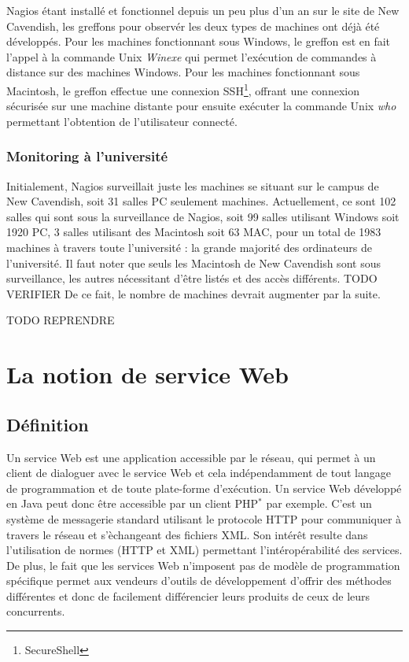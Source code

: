 Nagios \'etant install\'e et fonctionnel depuis un peu plus d'un an sur le site de New Cavendish, les greffons pour observ\'er les deux types de machines ont d\'ej\`a \'et\'e d\'evelopp\'es.
Pour les machines fonctionnant sous Windows, le greffon est en fait l'appel \`a la commande Unix \textit{Winexe} qui permet l'ex\'ecution de commandes \`a distance sur des machines Windows.
Pour les machines fonctionnant sous Macintosh, le greffon effectue une connexion SSH\protect\footnote{SecureShell}, offrant une connexion s\'ecuris\'ee sur une machine distante pour ensuite ex\'ecuter la commande Unix \textit{who} permettant l'obtention de l'utilisateur connect\'e.

\subsubsection{\og{}Monitoring\fg{} \`a l'universit\'e}

Initialement, Nagios surveillait juste les machines se situant sur le campus de New Cavendish, soit 31 salles PC seulement machines.
Actuellement, ce sont 102 salles qui sont sous la surveillance de Nagios, soit 99 salles utilisant Windows soit 1920 PC, 3 salles utilisant des Macintosh soit 63 MAC, pour un total de 1983 machines \`a travers toute l'universit\'e : la grande majorit\'e des ordinateurs de l'universit\'e.
Il faut noter que seuls les Macintosh de New Cavendish sont sous surveillance, les autres n\'ecessitant d'\^etre list\'es et des acc\`es diff\'erents. TODO VERIFIER
De ce fait, le nombre de machines devrait augmenter par la suite.


TODO REPRENDRE



\section{La notion de service Web}
\label{section:serviceWeb}

\subsection{D\'efinition}

Un service Web est une application accessible par le r\'eseau, qui permet \`a un client de dialoguer avec le service Web et cela ind\'ependamment de tout langage de programmation et de toute plate-forme d'ex\'ecution.
Un service Web d\'evelopp\'e en Java peut donc \^etre accessible par un client PHP$^*$ par exemple.
C'est un syst\`eme de messagerie standard utilisant le protocole HTTP pour communiquer \`a travers le r\'eseau et s'\`echangeant des fichiers XML.
Son int\'er\^et resulte dans l'utilisation de normes (HTTP et XML) permettant l'int\'erop\'erabilit\'e des services.
De plus, le fait que les services Web n'imposent pas de mod\`ele de programmation sp\'ecifique permet aux vendeurs d'outils de d\'eveloppement d'offrir des m\'ethodes diff\'erentes et donc de facilement diff\'erencier leurs produits de ceux de leurs concurrents.

